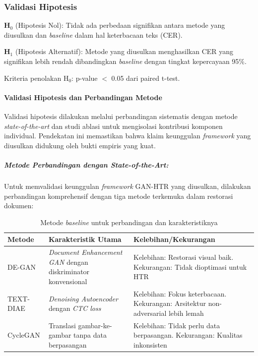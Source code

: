 \documentclass[12pt,a4paper]{article}
\begin{document}
\subsubsection{Validasi Hipotesis}
\textbf{H$_0$} (Hipotesis Nol): Tidak ada perbedaan signifikan antara metode yang diusulkan dan \textit{baseline} dalam hal keterbacaan teks (CER).

\textbf{H$_1$} (Hipotesis Alternatif): Metode yang diusulkan menghasilkan CER yang signifikan lebih rendah dibandingkan \textit{baseline} dengan tingkat kepercayaan 95\%.

Kriteria penolakan H$_0$: p-value $<$ 0.05 dari paired t-test.

\paragraph{Validasi Hipotesis dan Perbandingan Metode}

Validasi hipotesis dilakukan melalui perbandingan sistematis dengan metode \textit{state-of-the-art} dan studi ablasi untuk mengisolasi kontribusi komponen individual. Pendekatan ini memastikan bahwa klaim keunggulan \textit{framework} yang diusulkan didukung oleh bukti empiris yang kuat.

\subparagraph{Metode Perbandingan dengan \textit{State-of-the-Art}:}
Untuk memvalidasi keunggulan \textit{framework} GAN-HTR yang diusulkan, dilakukan perbandingan komprehensif dengan tiga metode terkemuka dalam restorasi dokumen:

\begin{table}[H]
\centering
\caption{Metode \textit{baseline} untuk perbandingan dan karakteristiknya}
\label{tab:baseline-methods}
\small
\begin{tabular}{|l|p{5cm}|p{5.5cm}|}
\hline
\textbf{Metode} & \textbf{Karakteristik Utama} & \textbf{Kelebihan/Kekurangan} \\ \hline
DE-GAN & \textit{Document Enhancement GAN} dengan diskriminator konvensional & Kelebihan: Restorasi visual baik. Kekurangan: Tidak dioptimasi untuk HTR \\ \hline
TEXT-DIAE & \textit{Denoising Autoencoder} dengan \textit{CTC loss} & Kelebihan: Fokus keterbacaan. Kekurangan: Arsitektur non-adversarial lebih lemah \\ \hline
CycleGAN & Translasi gambar-ke-gambar tanpa data berpasangan & Kelebihan: Tidak perlu data berpasangan. Kekurangan: Kualitas inkonsisten \\ \hline
\end{tabular}
\end{table}
\end{document}
